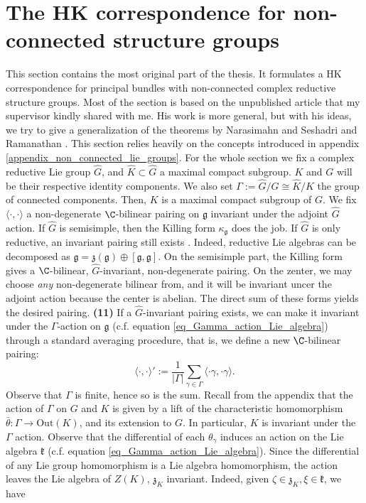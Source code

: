 \section{The HK correspondence for non-connected structure groups}
{\color{violet}
This section contains the most original part of the thesis. It formulates a HK correspondence for principal bundles with non-connected complex reductive structure groups. Most of the section is based on the unpublished article \parencite{HKnonconnected} that my supervisor kindly shared with me. His work is more general, but with his ideas, we try to give a generalization of the theorems by Narasimahn and Seshadri \parencite{NS1965} and Ramanathan \parencite{Ramanathan1996}. This section relies heavily on the concepts introduced in appendix \ref{appendix_non_connected_lie_groups}. For the whole section we fix a complex reductive Lie group \(\hat{G}\), and \(\hat{K}\subset \hat{G}\) a maximal compact subgroup. \(K\) and \(G\) will be their respective identity components. We also set \(\Gamma:=\hat{G}/G  \cong\hat{K}/K\) the group of connected components. Then, \(K\) is a maximal compact subgroup of \(G\). We fix \(\langle \cdot , \cdot \rangle\) a non-degenerate \(\C\)-bilinear pairing on \(\mathfrak{g}\) invariant under the adjoint \(\hat{G}\) action. If \(\hat{G}\) is semisimple, then the Killing form \(\kappa_{\mathfrak{g}}\) does the job. If \(\hat{G}\) is only reductive, an invariant pairing still exists \parencite{Benito2024}. Indeed, reductive Lie algebras can be decomposed as \(\mathfrak{g}=\mathfrak{z}(\mathfrak{g})\oplus [\mathfrak{g}, \mathfrak{g}]\). On the semisimple part, the Killing form gives a \(\C\)-bilinear, \(\hat{G}\)-invariant, non-degenerate pairing. On the zenter, we may choose \textit{any} non-degenerate bilinear from, and it will be invariant uncer the adjoint action because the center is abelian. The direct sum of these forms yields the desired pairing. \textbf{(11)} If a \(\hat{G}\)-invariant pairing exists, we can make it invariant under the \(\Gamma\)-action on \(\mathfrak{g}\) (c.f. equation \eqref{eq_Gamma_action_Lie_algebra}) through a standard averaging procedure, that is, we define a new \(\C\)-bilinear pairing:
\[
\langle \cdot, \cdot \rangle':=\frac{1}{|\Gamma|} \sum_{\gamma \in \Gamma} \langle \cdot \gamma, \cdot \gamma \rangle.
\]
Observe that \(\Gamma\) is finite, hence so is the sum. Recall from the appendix that the action of \(\Gamma\) on \(G\) and \(K\) is given by a lift of the characteristic homomorphism \(\bar{\theta}\colon \Gamma \to \mathrm{Out}(K)\), and its extension to \(G\). In particular, \(K\) is invariant under the \(\Gamma\) action. Observe that the differential of each \(\theta_\gamma\) induces an action on the Lie algebra \(\mathfrak{k}\) (c.f. equation \eqref{eq_Gamma_action_Lie_algebra}). Since the differential of any Lie group homomorphism is a Lie algebra homomorphism, the action leaves the Lie algebra of \(Z(K)\), \(\mathfrak{z}_K\) invariant. Indeed, given \(\zeta \in \mathfrak{z}_K, \xi \in \mathfrak{k}\), we have
}
